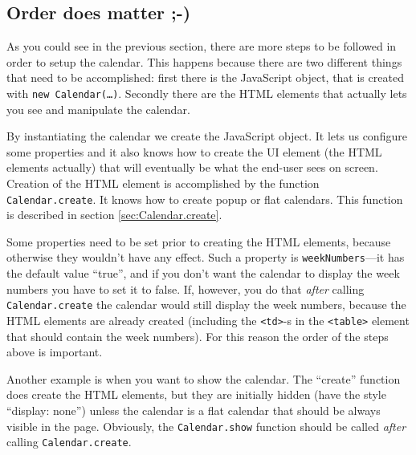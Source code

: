 \documentclass[a4paper,10pt]{article}
\begin{document}
\subsection{Order does matter ;-)}

As you could see in the previous section, there are more steps to be followed
in order to setup the calendar.  This happens because there are two different
things that need to be accomplished: first there is the JavaScript object, that
is created with \texttt{new Calendar(\ldots)}.  Secondly there are the HTML
elements that actually lets you see and manipulate the calendar.

{\begin{small}
\end{small}}

By instantiating the calendar we create the JavaScript object.  It lets us
configure some properties and it also knows how to create the UI element (the
HTML elements actually) that will eventually be what the end-user sees on
screen.  Creation of the HTML element is accomplished by the function
\texttt{Calendar.create}.  It knows how to create popup or flat calendars.
This function is described in section \ref{sec:Calendar.create}.

Some properties need to be set prior to creating the HTML elements, because
otherwise they wouldn't have any effect.  Such a property is
\texttt{weekNumbers}---it has the default value ``true'', and if you don't
want the calendar to display the week numbers you have to set it to false.  If,
however, you do that \emph{after} calling \texttt{Calendar.create} the calendar
would still display the week numbers, because the HTML elements are already
created (including the \texttt{<td>}-s in the \texttt{<table>} element that
should contain the week numbers).  For this reason the order of the steps above
is important.

Another example is when you want to show the calendar.  The ``create'' function
does create the HTML elements, but they are initially hidden (have the style
``display: none'') unless the calendar is a flat calendar that should be always
visible in the page.  Obviously, the \texttt{Calendar.show} function should be
called \emph{after} calling \texttt{Calendar.create}.
\end{document}
